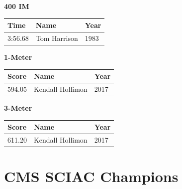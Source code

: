 \vspace{1.2em}
\noindent\begin{minipage}[t]{0.48\textwidth}
\centering
\textbf{\textcolor{teamprimary}{400 IM}}\par
\vspace{0.5em}
\centering
\small
\renewcommand{\arraystretch}{1.0}
\setlength{\tabcolsep}{4pt}
\begin{tabular}{@{}p{1.8cm}p{3.0cm}p{1.0cm}@{}}
\toprule
\textbf{Time} & \textbf{Name} & \textbf{Year} \\
\midrule
3:56.68 & Tom Harrison & 1983 \\
\bottomrule
\end{tabular}
\end{minipage}
\hfill
\begin{minipage}[t]{0.48\textwidth}
\centering
\textbf{\textcolor{teamprimary}{1-Meter}}\par
\vspace{0.5em}
\centering
\small
\renewcommand{\arraystretch}{1.0}
\setlength{\tabcolsep}{4pt}
\begin{tabular}{@{}p{1.8cm}p{3.0cm}p{1.0cm}@{}}
\toprule
\textbf{Score} & \textbf{Name} & \textbf{Year} \\
\midrule
594.05 & Kendall Hollimon & 2017 \\
\bottomrule
\end{tabular}
\end{minipage}
\vspace{1.2em}
\noindent\begin{minipage}[t]{0.98\textwidth}
\centering
\textbf{\textcolor{teamprimary}{3-Meter}}\par
\vspace{0.5em}
\centering
\small
\renewcommand{\arraystretch}{1.0}
\setlength{\tabcolsep}{4pt}
\begin{tabular}{@{}p{1.8cm}p{3.0cm}p{1.0cm}@{}}
\toprule
\textbf{Score} & \textbf{Name} & \textbf{Year} \\
\midrule
611.20 & Kendall Hollimon & 2017 \\
\bottomrule
\end{tabular}
\end{minipage}
\vspace{-0.5em}
\clearpage
\section{CMS SCIAC Champions}
\clearpage
